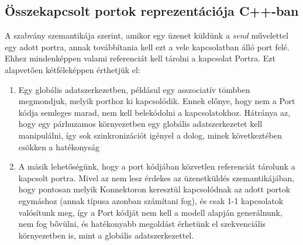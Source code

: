 \documentclass[a4paper,12pt]{report}
\begin{document}
\subsection{Összekapcsolt portok reprezentációja C++-ban} \label{conn_cpp}
A szabvány szemantikája szerint, amikor egy üzenet küldünk a \textit{send} művelettel egy adott portra, annak továbbítania kell ezt a vele kapcsolatban álló port felé. Ehhez mindenképpen valami referenciát kell tárolni a kapcsolat Portra. Ezt alapvetően kétféleképpen érthetjük el:\\
\begin{enumerate}
\item Egy globális adatszerkezetben, példásul egy asszociatív tömbben megmondjuk, melyik porthoz ki kapcsolódik. Ennek előnye, hogy nem a Port kódja semleges marad, nem kell belekódolni a kapcsolatokhoz.
Hátránya az, hogy egy párhuzamos környezetben egy globális adatszerkezetet kell manipulálni, így sok szinkronizációt igényel a dolog, minek következtében csökken a hatékonyság
\item A másik lehetőségünk, hogy a port kódjában közvetlen referenciát tárolunk a kapcsolt portra. Mivel az nem lesz érdekes az üzenetküldés szemantikájában, hogy pontosan melyik Konnektoron keresztül kapcsolódnak az adott portok egymáshoz (annak típusa azonban számítani fog), és csak 1-1 kapcsolatok valósítunk meg, így a Port kódját nem kell a modell alapján generálnunk, nem fog bővülni, és hatékonyabb megoldást érhetünk el szekvenciális környezetben is, mint a globális adatszerkezettel. 
\end{enumerate}
\end{document}
